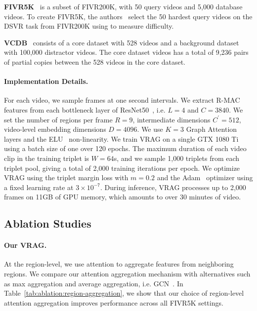 \documentclass[letterpaper]{article} \usepackage{aaai22}  \usepackage{times}  \usepackage{helvet}  \usepackage{courier}  \usepackage[hyphens]{url}  \usepackage{graphicx} \urlstyle{rm} \usepackage{amsmath}
\begin{document}
\vspace{0mm}
\noindent \textbf{FIVR5K}~\cite{dataset:fivr200k, kordopatiszilos2019visil} is a subset of FIVR200K, with 50 query videos and 5,000 database videos. To create FIVR5K, the authors~\cite{kordopatiszilos2019visil} select the 50 hardest query videos on the DSVR task from FIVR200K using \cite{lbow} to measure difficulty.

\vspace{0mm}
\noindent \textbf{VCDB}~\cite{dataset:vcdb} consists of a core dataset with 528 videos and a background dataset with 100,000 distractor videos. The core dataset videos has a total of 9,236 pairs of partial copies between the 528 videos in the core dataset.

\paragraph{Implementation Details.}
For each video, we sample frames at one second intervals. We extract R-MAC features from each bottleneck layer of ResNet50~\cite{resnet}, i.e. $L=4$ and $C=3840$. We set the number of regions per frame $R=9$, intermediate dimensions $C^\prime=512$, video-level embedding dimensions $D=4096$. We use $K=3$ Graph Attention~\cite{graph-attention} layers and the ELU~\cite{nonlinearity:elu} non-linearity.
We train VRAG on a single GTX 1080 Ti using a batch size of one over 120 epochs. The maximum duration of each video clip in the training triplet is $W=64$s, and we sample 1,000 triplets from each triplet pool, giving a total of 2,000 training iterations per epoch. We optimize VRAG using the triplet margin loss with $m=0.2$ and the Adam~\cite{optimizer:adam} optimizer using a fixed learning rate at $3 \times 10^{-7}$. During inference, VRAG processes up to 2,000 frames on 11GB of GPU memory, which amounts to over 30 minutes of video.


\subsection{Ablation Studies}





\paragraph{Our VRAG.}
At the region-level, we use attention to aggregate features from neighboring regions. We compare our attention aggregation mechanism with alternatives such as max aggregation and average aggregation, i.e. GCN~\cite{gcn}. In Table~\ref{tab:ablation:region-aggregation}, we show that our choice of region-level attention aggregation improves performance across all FIVR5K settings.
\end{document}
